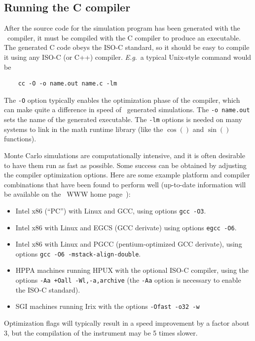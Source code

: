 \subsection{Running the C compiler}
\label{s:compile}

After the source code for the simulation program has been generated with
the \MCS\ compiler, it must be compiled with the C compiler to produce
an executable. The generated C code obeys the ISO-C standard, so it
should be easy to compile it using any ISO-C (or C++) compiler. \textit{E.g}.\ a
typical Unix-style command would be
\begin{verbatim}
    cc -O -o name.out name.c -lm
\end{verbatim}
The \verb+-O+ option typically enables the optimization phase of the compiler,
which can make quite a difference in speed of \MCS\ generated simulations. The
\verb+-o name.out+ sets the name of the generated executable. The \verb+-lm+
options is needed on many systems to link in the math runtime library (like the
$\cos()$ and $\sin()$ functions). 

Monte Carlo simulations are computationally intensive, and it is
often desirable to have them run as fast as possible. Some success can
be obtained by adjusting the compiler optimization
options. Here are some example platform and compiler combinations that
have been found to perform well (up-to-date information will be
available on the \MCS\ WWW home page~\cite{mcstas_webpage}):
\begin{itemize}
\item Intel x86 (``PC'') with Linux and GCC, using options \verb+gcc -O3+.
\item Intel x86 with Linux and EGCS (GCC derivate) using
  options \verb+egcc -O6+.
\item Intel x86 with Linux and PGCC (pentium-optimized GCC derivate), using
  options \verb+gcc -O6 -mstack-align-double+.
\item HPPA machines running HPUX with the optional ISO-C compiler,
  using the options
  \verb|-Aa +Oall -Wl,-a,archive| (the \verb+-Aa+ option is necessary to
  enable the ISO-C standard).
\item SGI machines running Irix with the options
  \verb|-Ofast -o32 -w|
\end{itemize}
Optimization flags will typically result in a speed improvement by a factor
about 3, but the compilation of the instrument may be 5 times slower.

